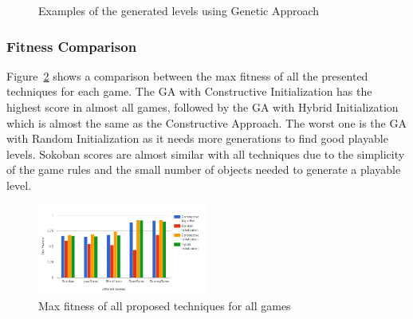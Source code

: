 \documentclass[letterpaper]{article}
\newcommand{\figref}[1]{Figure~\ref{Figure:#1}}
\begin{document}
\begin{figure}[ht]
  	\centering
    \caption{Examples of the generated levels using Genetic Approach}
    \label{Figure:geneticExamples}
\end{figure}

\subsubsection{Fitness Comparison}
\figref{maxFitnessComparison} shows a comparison between the max fitness of all the presented techniques for each game. The GA with Constructive Initialization has the highest score in almost all games, followed by the GA with Hybrid Initialization which is almost the same as the Constructive Approach. The worst one is the GA with Random Initialization as it needs more generations to find good playable levels. Sokoban scores are almost similar with all techniques due to the simplicity of the game rules and the small number of objects needed to generate a playable level.

\begin{figure}[ht]
  	\centering
    \includegraphics[width=0.5\textwidth]{Images/Level_MaxFitness_Comparison}
    \caption{Max fitness of all proposed techniques for all games}
    \label{Figure:maxFitnessComparison}
\end{figure}
\end{document}
